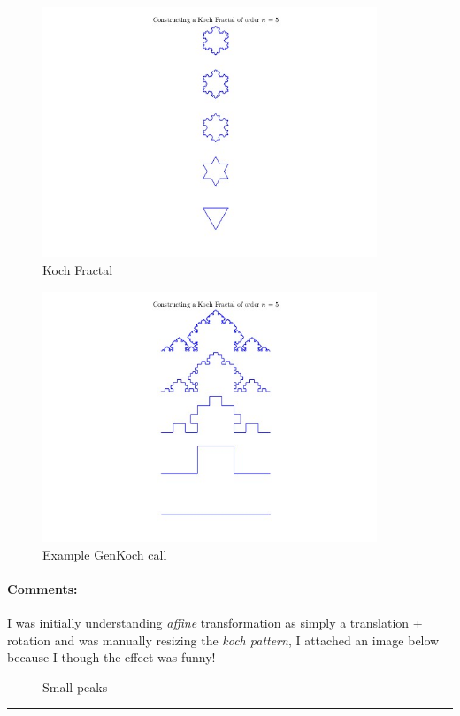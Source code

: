 \begin{figure}[H]
    \centering
    \includegraphics[width=10cm]{figures/koch.jpg}
    \caption{Koch Fractal}
    \label{fig:figures/koch.jpg}
\end{figure}

\begin{figure}[H]
    \centering
    \includegraphics[width=10cm]{figures/genkoch.jpg}
    \caption{Example GenKoch call}
    \label{fig:figures/genkoch.jpg}
\end{figure}

\paragraph{Comments:}

I was initially understanding \textit{affine} transformation as
simply a translation + rotation and was manually resizing the \textit{koch
pattern}, I attached an image below because I though the effect was funny!

\begin{figure}[H]
    \centering
    
    \caption{Small peaks}
    \label{fig:figures/small_peaks.svg}
\end{figure}

\bigskip
\hrule

